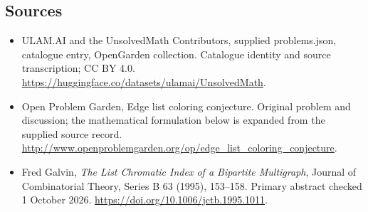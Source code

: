 \documentclass[11pt,a4paper]{article}
\begin{document}
\subsection{Sources}
\begin{itemize}
\item[S1] ULAM.AI and the UnsolvedMath Contributors, supplied problems.json, catalogue entry, OpenGarden collection. Catalogue identity and source transcription; CC BY 4.0.
\url{https://huggingface.co/datasets/ulamai/UnsolvedMath}.
\item[S2] Open Problem Garden, Edge list coloring conjecture. Original problem and discussion; the mathematical formulation below is expanded from the supplied source record.
\url{http://www.openproblemgarden.org/op/edge_list_coloring_conjecture}.
\item[R1] Fred Galvin, \emph{The List Chromatic Index of a Bipartite
Multigraph}, Journal of Combinatorial Theory, Series B 63 (1995), 153--158.
Primary abstract checked 1 October 2026.
\url{https://doi.org/10.1006/jctb.1995.1011}.
\end{itemize}
\end{document}
